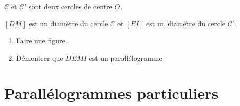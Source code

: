 \documentclass[a4paper,10pt]{report}
\begin{document}
\begin{ex}
$\mathcal{C}$ et $\mathcal{C}’$ sont deux cercles de centre $O$.

\noindent $[DM]$ est un diamètre du cercle $\mathcal{C}$ et $[EI]$ est un diamètre du cercle $\mathcal{C}’$.
\begin{enumerate}
\item Faire une figure.
\item Démontrer que $DEMI$ est un parallélogramme.
\end{enumerate}

\noindent\grandscarreaux{\linewidth}{6.4cm}
\end{ex}

\section{Parallélogrammes particuliers}
\end{document}
